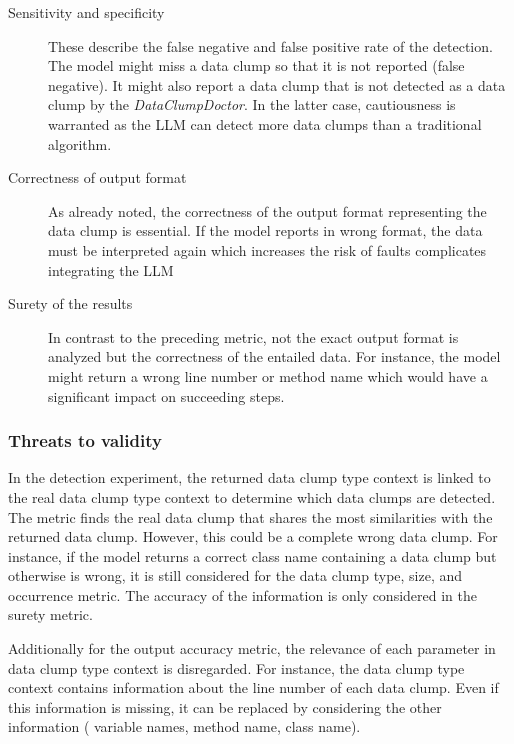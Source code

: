 \begin{description}
    \item[Sensitivity and specificity] These describe the false negative and false positive rate of the detection. The model might miss a data clump so that it is not reported (false negative). It might also report  a data clump that is not detected as a data clump by the \textit{DataClumpDoctor}. In the latter case, cautiousness is warranted as the \ac{LLM} can detect more data clumps than a traditional algorithm. 

    \item[Correctness of output format]

    As already noted, the correctness of the output format representing the data clump is essential. If the model reports in wrong format, the data must be interpreted again which increases the risk of faults complicates integrating the \ac{LLM}

    \item [Surety of the results] In contrast to the preceding metric, not the exact output format is analyzed but the correctness of the entailed data. For instance, the model might return a wrong line number or method name which would have a significant impact on succeeding steps. 

    

   
\end{description}

\subsubsection{Threats to validity}

In the detection experiment, the returned data clump type context is linked to the real data clump type context to determine which data clumps are detected. The metric finds the real data clump that shares the most similarities with the returned data clump. However, this could be a complete wrong data clump. For instance, if the model returns a correct class name containing a data clump but otherwise is wrong, it is still considered for the data clump type, size, and occurrence metric. The accuracy of the information is only considered in the surety metric.

Additionally for the output accuracy metric, the relevance of each parameter in data clump type context is disregarded. For instance, the data clump type context contains information about the line number of each data clump. Even if this information is missing, it can be replaced by considering the other information ( variable names, method name, class name). 


